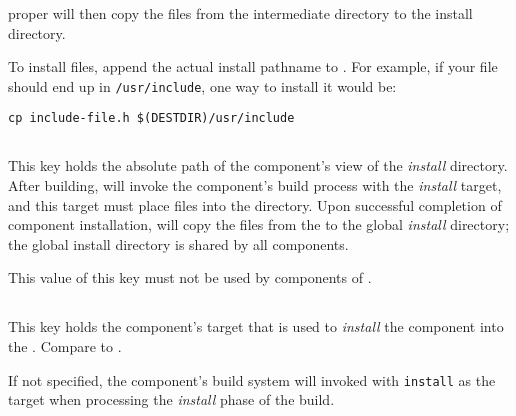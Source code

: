 \lmsbw proper will then copy the files from the intermediate directory
to the install directory.

To install files, append the actual install pathname to \destdir.  For
example, if your file should end up in \texttt{/usr/include}, one way
to install it would be:

\begin{verbatim}
cp include-file.h $(DESTDIR)/usr/include
\end{verbatim}


\subsection{}\label{variables:install-directory}

This key holds the absolute path of the component's view of the
\emph{install} directory.  After building, \lmsbw will invoke the
component's build process with the \emph{install} target, and this
target must place files into the \destdir directory.  Upon successful
completion of component installation, \lmsbw will copy the files from
the \destdir to the global \emph{install} directory; the global
install directory is shared by all components.

This value of this key must not be used by components of \lmsbw.


\subsection{}\label{variables:install-target}

This key holds the component's \makefile target that is used to
\emph{install} the component into the \destdir.  Compare to
.

If not specified, the component's build system will invoked with
\texttt{install} as the target when processing the \emph{install}
phase of the build.

\label{variables:install-target}

\subsection{}\label{variables:kind}

